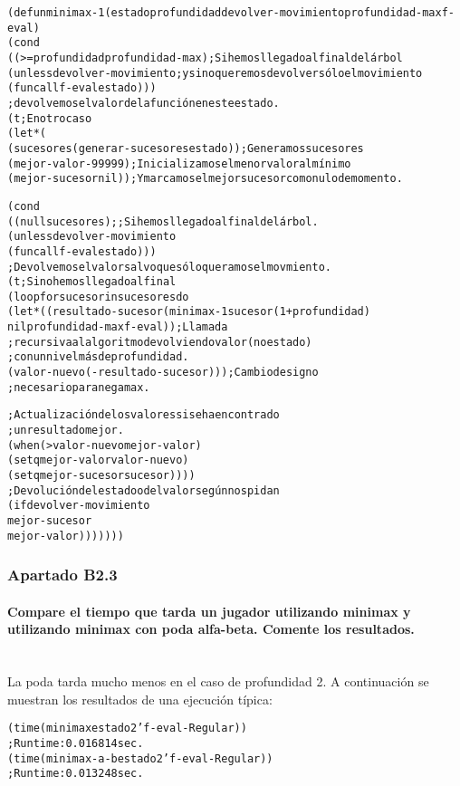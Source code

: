 \documentclass{apuntes}
\begin{document}
\begin{alltt}
(defun minimax-1 (estado profundidad devolver-movimiento profundidad-max f-eval)
  (cond 
    ((>= profundidad profundidad-max) ; Si hemos llegado al final del árbol
      (unless devolver-movimiento ; y si no queremos devolver sólo el movimiento
        (funcall f-eval estado)))
         ; devolvemos el valor de la función en este estado.
    (t ; En otro caso 
      (let* (
        (sucesores (generar-sucesores estado)) ; Generamos sucesores
        (mejor-valor -99999) ; Inicializamos el menor valor al mínimo
        (mejor-sucesor nil)) ; Y marcamos el mejor sucesor como nulo de momento.
        
        (cond 
          ((null sucesores) ;; Si hemos llegado al final del árbol.
            (unless devolver-movimiento 
              (funcall f-eval estado)))
              ; Devolvemos el valor salvo que sólo queramos el movmiento.
          (t ; Si no hemos llegado al final
            (loop for sucesor in sucesores do 
              (let* ((resultado-sucesor (minimax-1 sucesor (1+ profundidad)
                                  nil profundidad-max f-eval)) ; Llamada 
                ; recursiva al algoritmo devolviendo valor (no estado)
                ; con un nivel más de profundidad.
                     (valor-nuevo (- resultado-sucesor))) ; Cambio de signo 
                ; necesario para negamax.

                ; Actualización de los valores si se ha encontrado 
                ; un resultado mejor.
                (when (> valor-nuevo mejor-valor) 
                  (setq mejor-valor valor-nuevo)
                  (setq mejor-sucesor  sucesor ))))
            ; Devolución del estado o del valor según nos pidan
            (if devolver-movimiento 
              mejor-sucesor 
              mejor-valor)))))))
\end{alltt}
\subsubsection*{Apartado B2.3}

\paragraph{Compare el tiempo que tarda un jugador utilizando minimax y utilizando minimax con poda alfa-beta. Comente los resultados. \\\\} 

La poda tarda mucho menos en el caso de profundidad 2. A continuación se muestran los resultados de una ejecución típica:
\begin{alltt}
(time (minimax estado 2 'f-eval-Regular)) 
  ; Run time: 0.016814 sec.
(time (minimax-a-b estado 2 'f-eval-Regular)) 
  ; Run time: 0.013248 sec.
\end{alltt}
\end{document}
